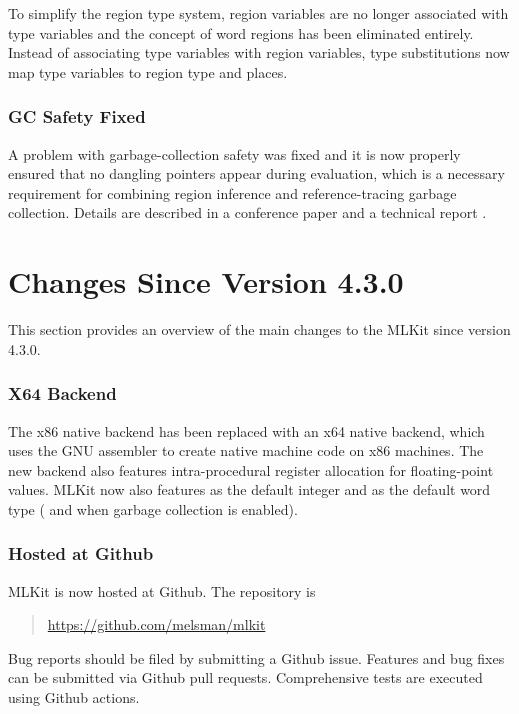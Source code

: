\documentclass[12pt]{book}
\begin{document}
To simplify the region type system, region variables are no longer associated
with type variables and the concept of word regions has been eliminated
entirely. Instead of associating type variables with region variables, type
substitutions now map type variables to region type and places.

\subsubsection*{GC Safety Fixed}

A problem with garbage-collection safety was fixed and it is now properly
ensured that no dangling pointers appear during evaluation, which is a necessary
requirement for combining region inference and reference-tracing garbage
collection. Details are described in a conference paper \cite{10.1145/3591229}
and a technical report \cite{gcsafety-revisited-tr-2022}.

\section{Changes Since Version 4.3.0}
%
%
This section provides an overview of the main changes to the MLKit since version
4.3.0.

\subsubsection*{X64 Backend}
The
%
%
%
x86 native backend has been replaced with an
%
%
%
x64 native backend, which uses the GNU assembler to create native machine code
on x86 machines. The new backend also features intra-procedural register
allocation for floating-point values. MLKit now also features 
as the default integer and  as the default word type
( and  when garbage collection is enabled).

\subsubsection*{Hosted at Github}
%
%
%
%
MLKit is now hosted at Github. The repository is
\begin{quote}
  \url{https://github.com/melsman/mlkit}
\end{quote}
%
%
%
%
Bug reports should be filed by submitting a Github issue. Features and bug fixes
can be submitted via Github pull requests. Comprehensive tests are executed
using Github actions.
\end{document}
